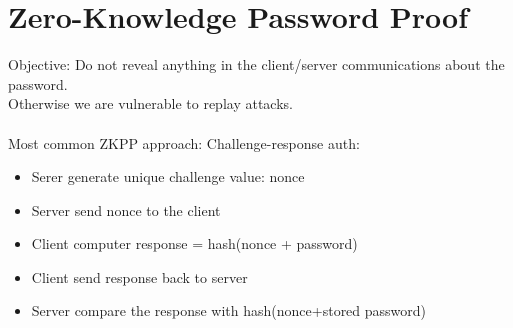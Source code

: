\documentclass{article}[18pt]
\begin{document}
\section{Zero-Knowledge Password Proof}
Objective: Do not reveal anything in the client/server communications about the password.\\
Otherwise we are vulnerable to replay attacks.\\
\\
Most common ZKPP approach: Challenge-response auth:
\begin{itemize}
	\item Serer generate unique challenge value: nonce
	\item Server send nonce to the client
	\item Client computer response = hash(nonce + password)
	\item Client send response back to server
	\item Server compare the response with hash(nonce+stored password)
\end{itemize}
\end{document}
